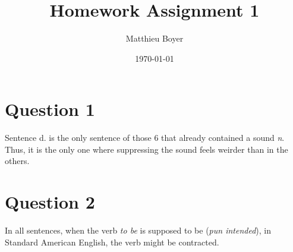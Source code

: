 \documentclass{cours}
\title{Homework Assignment 1}
\author{Matthieu Boyer}
\date{\today}
\begin{document}
\section{Question 1}
Sentence d. is the only sentence of those 6 that already contained a sound \textsl{n}. Thus, it is the only one where suppressing the sound feels weirder than in the others.

\section{Question 2}
In all sentences, when the verb \textsl{to be} is supposed to be (\textit{pun intended}), in Standard American English, the verb might be contracted. 
\end{document}

